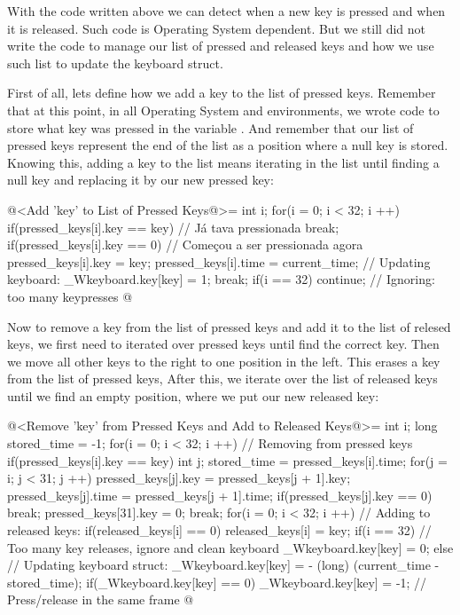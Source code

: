 
With the code written above we can detect when a new key is pressed
and when it is released. Such code is Operating System dependent. But
we still did not write the code to manage our list of pressed and
released keys and how we use such list to update the keyboard struct.

First of all, lets define how we add a key to the list of pressed
keys. Remember that at this point, in all Operating System and
environments, we wrote code to store what key was pressed in the
variable . And remember that our list of pressed keys
represent the end of the list as a position where a null key is
stored. Knowing this, adding a key to the list means iterating in the
list until finding a null key and replacing it by our new pressed key:

\iniciocodigo
@<Add 'key' to List of Pressed Keys@>=
{
  int i;
  for(i = 0; i < 32; i ++){
    if(pressed_keys[i].key == key) // Já tava pressionada
      break;
    if(pressed_keys[i].key == 0){ // Começou a ser pressionada agora
      pressed_keys[i].key = key;
      pressed_keys[i].time = current_time;
      // Updating keyboard:
      _Wkeyboard.key[key] = 1;
      break;
    }
  }
  if(i == 32) continue; // Ignoring: too many keypresses
}
@
\fimcodigo

Now to remove a key from the list of pressed keys and add it to the
list of relesed keys, we first need to iterated over pressed keys
until find the correct key. Then we move all other keys to the right
to one position in the left. This erases a key from the list of
pressed keys, After this, we iterate over the list of released keys
until we find an empty position, where we put our new released key:

\iniciocodigo
@<Remove 'key' from Pressed Keys and Add to Released Keys@>=
{
  int i;
  long stored_time = -1;
  for(i = 0; i < 32; i ++){ // Removing from pressed keys
    if(pressed_keys[i].key == key){
      int j;
      stored_time = pressed_keys[i].time;
      for(j = i; j < 31; j ++){
        pressed_keys[j].key = pressed_keys[j + 1].key;
        pressed_keys[j].time = pressed_keys[j + 1].time;
        if(pressed_keys[j].key == 0)
          break;
      }
      pressed_keys[31].key = 0;
      break;
    }
  }
  for(i = 0; i < 32; i ++){ // Adding to released keys:
    if(released_keys[i] == 0)
      released_keys[i] = key;
  }
  if(i == 32) // Too many key releases, ignore and clean keyboard
    _Wkeyboard.key[key] = 0;
  else{
    // Updating keyboard struct:
    _Wkeyboard.key[key] = - (long) (current_time - stored_time);
    if(_Wkeyboard.key[key] == 0)
      _Wkeyboard.key[key] = -1; // Press/release in the same frame
  }
}
@
\fimcodigo

